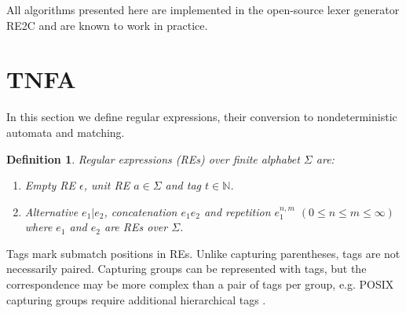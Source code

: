 \documentclass[]{article}
\newtheorem{definition}{Definition}
\newcommand{\YN}{\mathbb{N}}
\begin{document}
All algorithms presented here are implemented in the open-source lexer generator RE2C and are known to work in practice.

\pagebreak

\section{TNFA}\label{section_tnfa}


In this section we define regular expressions, their conversion to nondeterministic automata and matching.

\begin{definition}
Regular expressions (REs) over finite alphabet $\Sigma$ are:
\begin{enumerate}
    \item
      Empty RE $\epsilon$,
      unit RE $a \in \Sigma$
      and tag $t \in \YN$.
    \item Alternative $e_1 | e_2$,
      concatenation $e_1 e_2$ and
      repetition $e_1^{n, m}$ $(0 \!\leq\! n \!\leq\! m \!\leq\! \infty)$
      where $e_1$ and $e_2$ are REs over $\Sigma$.
\end{enumerate}
\end{definition}

Tags mark submatch positions in REs.
Unlike capturing parentheses, tags are not necessarily paired.
Capturing groups can be represented with tags,
but the correspondence may be more complex than a pair of tags per group,
e.g. POSIX capturing groups require additional hierarchical tags \cite{BorTro19}.
\medskip
\end{document}
